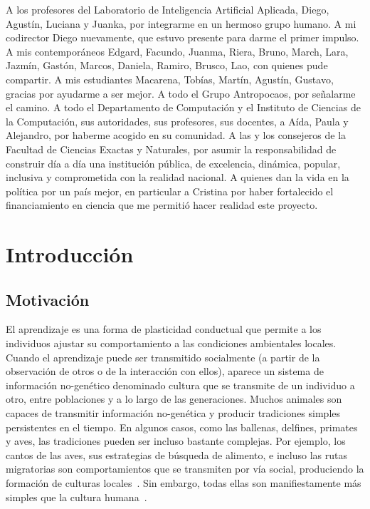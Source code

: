 \documentclass[a4paper,11pt]{book}
\makeatletter
\renewcommand{\mainmatter}{\cleardoublepage\@mainmattertrue}
\theoremstyle{definition}
\makeatother
\begin{document}
%
A los profesores del Laboratorio de Inteligencia Artificial Aplicada, Diego, Agust\'in, Luciana y Juanka, por integrarme en un hermoso grupo humano.
%
A mi codirector Diego nuevamente, que estuvo presente para darme el primer impulso.
%
A mis contempor\'aneos Edgard, Facundo, Juanma, Riera, Bruno, March, Lara, Jazm\'in, Gast\'on, Marcos, Daniela, Ramiro, Brusco, Lao, con quienes pude compartir.
%
A mis estudiantes Macarena, Tob\'ias, Mart\'in, Agust\'in, Gustavo, gracias por ayudarme a ser mejor.
%
A todo el Grupo Antropocaos, por se\~nalarme el camino.
%
A todo el Departamento de Computaci\'on y el Instituto de Ciencias de la Computaci\'on, sus autoridades, sus profesores, sus docentes, a A\'ida, Paula y Alejandro, por haberme acogido en su comunidad.
%
A las y los consejeros de la Facultad de Ciencias Exactas y Naturales, por asumir la responsabilidad de construir d\'ia a d\'ia una instituci\'on p\'ublica, de excelencia, din\'amica, popular, inclusiva y comprometida con la realidad nacional.
%
A quienes dan la vida en la pol\'itica por un pa\'is mejor, en particular a Cristina por haber fortalecido el financiamiento en ciencia que me permiti\'o hacer realidad este proyecto.









\mainmatter

\chapter{Introducci\'on} \label{ch:evo}

\section{Motivaci\'on}

El aprendizaje es una forma de plasticidad conductual que permite a los individuos ajustar su comportamiento a las condiciones ambientales locales.
%
Cuando el aprendizaje puede ser transmitido socialmente (a partir de la observaci\'on de otros o de la interacci\'on con ellos), aparece un sistema de informaci\'on no-gen\'etico denominado cultura que se transmite de un individuo a otro, entre poblaciones y a lo largo de las generaciones.
%
Muchos animales son capaces de transmitir informaci\'on no-gen\'etica y producir tradiciones simples persistentes en el tiempo.
%
En algunos casos, como las ballenas, delfines, primates y aves, las tradiciones pueden ser incluso bastante complejas.
%
Por ejemplo, los cantos de las aves, sus estrategias de b\'usqueda de alimento, e incluso las rutas migratorias son comportamientos que se transmiten por v\'ia social, produciendo la formaci\'on de culturas locales~\cite{aplin2022-birdsCulture}.
%
Sin embargo, todas ellas son manifiestamente m\'as simples que la cultura humana~\cite{boyd1996-whyCultureIsCommon}.
\end{document}
